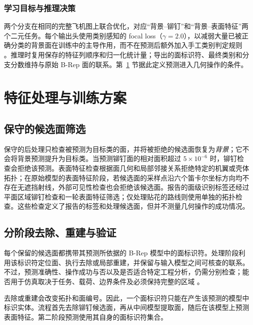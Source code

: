 \documentclass[12pt,a4paper]{ctexart}
\begin{document}
\subsubsection{学习目标与推理决策}\label{sec:training_inference}

两个分支在相同的完整飞机图上联合优化，对应“背景--铆钉”和“背景--表面特征”两个二元任务。每个输出头使用类别感知的 focal loss（$\gamma=2.0$），以减弱大量已被正确分类的背景面在训练中的主导作用，而不在预测后额外加入手工类别判定规则 \parencite{lin2017focal,buda2018imbalance}。推理时复用保存的特征列顺序和归一化统计量；导出的面标识符、最终类别和分支分数维持与原始 B-Rep 面的联系。第~\ref{sec:processing_pipeline} 节据此定义预测进入几何操作的条件。

\section{特征处理与训练方案}\label{sec:processing_pipeline}

\subsection{保守的候选面筛选}\label{sec:risk_filtering}

保守的后处理只检查被预测为目标类的面，并将被拒绝的候选面恢复为\textit{背景}；它不会将背景预测提升为目标类。当预测铆钉面的相对面积超过 $5\times10^{-6}$ 时，铆钉检查会拒绝该预测。表面特征检查根据面几何和局部邻接关系拒绝特定的机翼或壳体拓扑；在原始模型的表面特征阶段，若候选面的采样点沿六个笛卡尔坐标方向均不存在无遮挡射线，外部可见性检查也会拒绝该候选面。报告的面级识别标签还经过平面区域铆钉检查和一轮表面特征筛选；仅处理贴花的路线则使用单独的拓扑检查。这些检查定义了报告的标签和处理候选面，但并不测量几何操作的成功情况。

\subsection{分阶段去除、重建与验证}\label{sec:geometry_protocol}

每个保留的候选面都携带其预测所依据的 B-Rep 模型中的面标识符。处理阶段利用该标识符定位面、执行去除或局部重建，并保留与输入模型之间可核查的联系。不过，预测准确性、操作成功与否以及是否适合特定工程分析，仍需分别检查；能否用于仿真取决于任务、载荷、边界条件及必须保持完整的区域 \parencite{thakur2009cad_simplification,antolin2024analysis_aware_defeaturing}。

去除或重建会改变拓扑和面编号。因此，一个面标识符只能在产生该预测的模型中标识实体。流程首先去除铆钉候选面，再从中间模型提取面，随后在该模型上预测表面特征。第二阶段预测使用其自身的面标识符集合。
\end{document}
